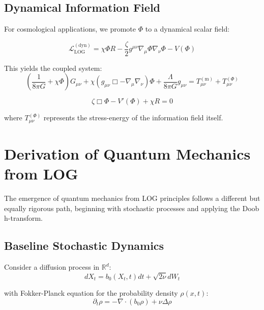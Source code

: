 \documentclass[12pt]{article}
\begin{document}
\subsection{Dynamical Information Field}

For cosmological applications, we promote $\Phi$ to a dynamical scalar field:

\begin{equation}
\mathcal{L}_{\mathrm{LOG}}^{\mathrm{(dyn)}} = \chi \Phi R - \frac{\zeta}{2}g^{\mu\nu}\nabla_\mu\Phi\nabla_\nu\Phi - V(\Phi) \tag{2.6}
\end{equation}

This yields the coupled system:
\begin{equation}
\left(\frac{1}{8\pi G} + \chi \Phi\right)G_{\mu\nu} + \chi(g_{\mu\nu}\Box - \nabla_\mu\nabla_\nu)\Phi + \frac{\Lambda}{8\pi G}g_{\mu\nu} = T_{\mu\nu}^{(\mathrm{m})} + T_{\mu\nu}^{(\Phi)} \tag{2.7}
\end{equation}

\begin{equation}
\zeta \Box\Phi - V'(\Phi) + \chi R = 0 \tag{2.8}
\end{equation}

where $T_{\mu\nu}^{(\Phi)}$ represents the stress-energy of the information field itself.

\section{Derivation of Quantum Mechanics from LOG}

The emergence of quantum mechanics from LOG principles follows a different but equally rigorous path, beginning with stochastic processes and applying the Doob h-transform.

\subsection{Baseline Stochastic Dynamics}

Consider a diffusion process in $\mathbb{R}^d$:
\begin{equation}
dX_t = b_0(X_t,t)dt + \sqrt{2\nu}dW_t \tag{3.1}
\end{equation}

with Fokker-Planck equation for the probability density $\rho(x,t)$:
\begin{equation}
\partial_t \rho = -\nabla \cdot (b_0 \rho) + \nu \Delta \rho \tag{3.2}
\end{equation}
\end{document}
